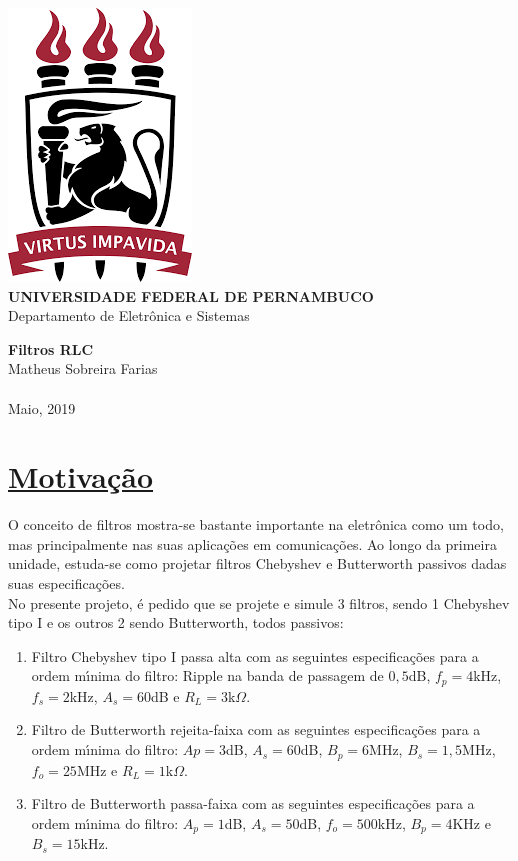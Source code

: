 \documentclass[14pt, oneside]{book}
\date{\vspace{-5ex}}
\newcommand\tab[1][1cm]{\hspace*{#1}}
\theoremstyle{definition}
\begin{document}

    \begin{titlepage}
        \centering 
        \includegraphics[scale = 0.8]{ufpe.png} \\
        \Large{\textbf{UNIVERSIDADE FEDERAL DE PERNAMBUCO}}\\
        \large{Departamento de Eletrônica e Sistemas}
   
        \Huge\textbf{Filtros RLC}\\
   
        \vfill
        \Large{Matheus Sobreira Farias}
        \\~\\
        \Large{Maio, 2019}
    \end{titlepage}

\tableofcontents
\mainmatter
        \chapter[Motivação]{\hyperlink{toc}{Motivação}}
            \tab O conceito de filtros mostra-se bastante importante na eletrônica como um todo, mas principalmente nas suas aplicações em comunicações. Ao longo da primeira unidade, estuda-se como projetar filtros Chebyshev e Butterworth passivos dadas suas especificações. \\
	        \tab No presente projeto, é pedido que se projete e simule 3 filtros, sendo 1 Chebyshev tipo I e os outros 2 sendo Butterworth, todos passivos:
            \begin{enumerate}
                \item Filtro Chebyshev tipo I passa alta com as seguintes especificações para a ordem mı́nima do filtro: Ripple na banda de passagem de $0,5$dB, $f_p = 4$kHz, $f_s = 2$kHz, $A_s = 60$dB e $R_L = 3$k$\Omega$.
                \item Filtro de Butterworth rejeita-faixa com as seguintes especificações para a ordem mı́nima do filtro: $Ap = 3$dB, $A_s = 60$dB, $B_p = 6$MHz, $B_s = 1, 5$MHz, $f_o = 25$MHz e $R_L = 1$k$\Omega$.
                \item Filtro de Butterworth passa-faixa com as seguintes especificações para a ordem mı́nima do filtro: $A_p= 1$dB, $A_s = 50$dB, $f_o = 500$kHz, $B_p = 4$KHz e $B_s =15$kHz.
            \end{enumerate}
           
\end{document}
